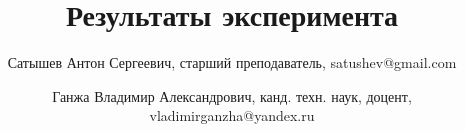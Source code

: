 \newcommand{\mainAuthor}{Сатышев Антон Сергеевич}
\newcommand{\articleTitle}{Результаты эксперимента}
\newcommand{\keywords}{снежно-ледяные образования, дисковый режущий инструмент, силовые параметры, радиус закругления, лёд, радиус закругления рабой кромки}


\author{\mainAuthor, старший преподаватель, satushev@gmail.com}
\author{Ганжа Владимир Александрович, канд. техн. наук, доцент, vladimirganzha@yandex.ru}

\title{\articleTitle}
\date{}
